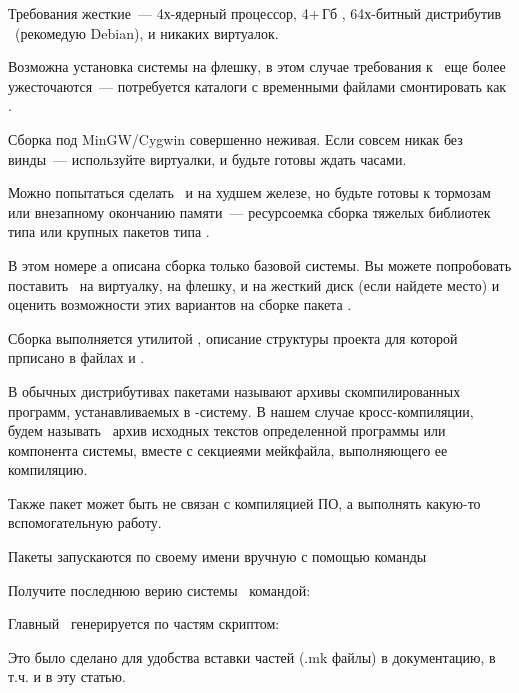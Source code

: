 {Требования жесткие\ --- 4х-ядерный процессор, 4+\,Гб \ram, 64х-битный
дистрибутив \linux\ (рекомедую Debian), и никаких виртуалок.

Возможна установка системы на флешку, в этом случае требования к \ram\ еще более
ужесточаются\ --- потребуется каталоги с временными файлами смонтировать как
.

Сборка под MinGW/Cygwin совершенно неживая. Если совсем никак без винды\ ---
используйте виртуалки, и будьте готовы ждать часами.

Можно попытаться сделать \ и на худшем железе, но будьте
готовы к тормозам или внезапному окончанию памяти\ --- ресурсоемка сборка
тяжелых библиотек типа  или крупных пакетов типа .

В этом номере \Scr а описана сборка только базовой системы. Вы можете
попробовать поставить \linux\ на виртуалку, на флешку, и на жесткий диск (если
найдете место) и оценить возможности этих вариантов на сборке пакета .


Сборка выполняется утилитой , описание структуры проекта для которой
прписано в файлах  и .

В обычных дистрибутивах пакетами называют архивы скомпилированных программ,
устанавливаемых в \linux-систему. В нашем случае кросс-компиляции, будем
называть \ архив исходных текстов определенной программы или
компонента системы, вместе с секциеями мейкфайла, выполняющего ее компиляцию.

Также пакет может быть не связан с компиляцией ПО, а выполнять какую-то
вспомогательную работу.

Пакеты запускаются по своему имени вручную с помощью команды



Получите последнюю верию системы \ командой:




Главный \ генерируется по частям скриптом:



Это было сделано для удобства вставки частей (.mk файлы) в документацию, в т.ч.
и в эту статью.

}
